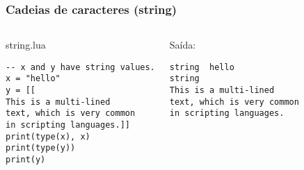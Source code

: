 \documentclass[brazil]{beamer}
\begin{document}
\begin{frame}[fragile]
  \frametitle{Cadeias de caracteres (string)}
  \pause
  \begin{columns}
      \begin{block}{string.lua}
        \begin{lstlisting}
-- x and y have string values.
x = "hello"
y = [[
This is a multi-lined
text, which is very common
in scripting languages.]]
print(type(x), x)
print(type(y))
print(y)
        \end{lstlisting}
      \end{block}
    \pause
      \begin{block}{Saída:}
        \begin{verbatim}
string  hello
string
This is a multi-lined
text, which is very common
in scripting languages.  \end{verbatim}
      \end{block}
  \end{columns}
\end{frame}
\end{document}
